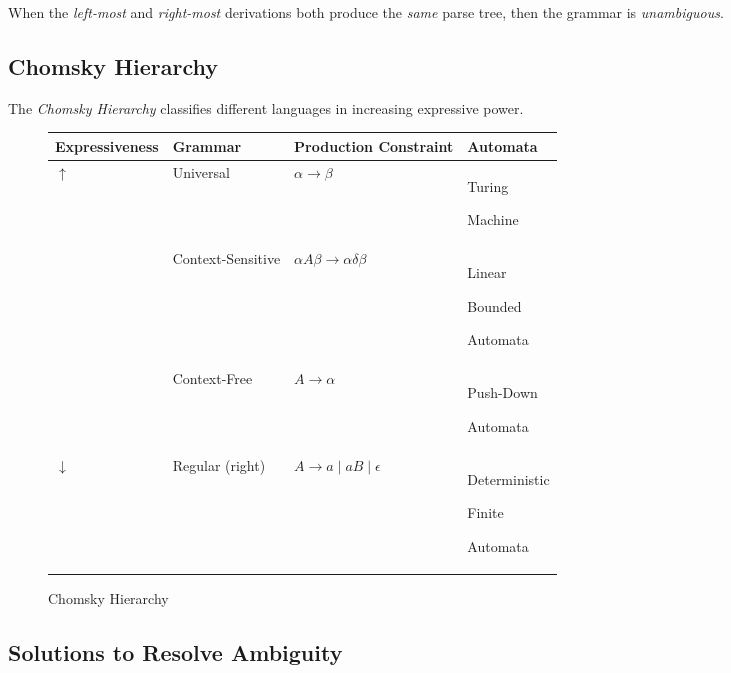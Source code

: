 \begin{example}
    When the \textit{left-most} and \textit{right-most} derivations both produce the \textit{same} parse tree, then the grammar is \textit{unambiguous}.
\end{example}

\subsection{Chomsky Hierarchy}

\begin{definition}
    The \textit{Chomsky Hierarchy} classifies different languages in increasing expressive power.
    
    \begin{figure}[H]
        \centering
        \begin{tabularx}{\textwidth}{@{} X X X X @{}}
            \toprule
            Expressiveness & Grammar & Production Constraint & Automata \\
            \midrule
            $\uparrow$ & Universal & $\alpha \to \beta$ & Turing \par Machine \\
            \phantom{} & Context-Sensitive & $\alpha A \beta \to \alpha \delta \beta$ & Linear \par Bounded \par Automata \\
            \phantom{} & Context-Free & $A \to \alpha$ & Push-Down \par Automata \\
            $\downarrow$ & Regular (right) & $A \to a \mid aB \mid \epsilon$ & Deterministic \par Finite \par Automata \\
            \bottomrule
        \end{tabularx}
        \caption{Chomsky Hierarchy}
        \label{fig:chomsky-hierarachy}
    \end{figure}
\end{definition}

\subsection{Solutions to Resolve Ambiguity}


